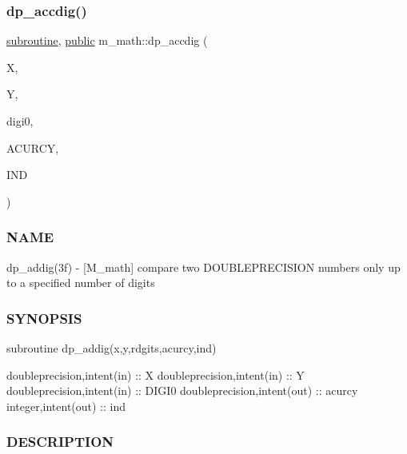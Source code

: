 \subsubsection{\texorpdfstring{dp\+\_\+accdig()}{dp\_accdig()}}
{\footnotesize\ttfamily \hyperlink{M__stopwatch_83_8txt_acfbcff50169d691ff02d4a123ed70482}{subroutine}, \hyperlink{M__stopwatch_83_8txt_a2f74811300c361e53b430611a7d1769f}{public} m\+\_\+math\+::dp\+\_\+accdig (\begin{DoxyParamCaption}\item[{doubleprecision, intent(\hyperlink{M__journal_83_8txt_afce72651d1eed785a2132bee863b2f38}{in})}]{X,  }\item[{doubleprecision, intent(\hyperlink{M__journal_83_8txt_afce72651d1eed785a2132bee863b2f38}{in})}]{Y,  }\item[{doubleprecision, intent(\hyperlink{M__journal_83_8txt_afce72651d1eed785a2132bee863b2f38}{in})}]{digi0,  }\item[{doubleprecision, intent(out)}]{A\+C\+U\+R\+CY,  }\item[{integer, intent(out)}]{I\+ND }\end{DoxyParamCaption})}



\subsubsection*{N\+A\+ME}

dp\+\_\+addig(3f) -\/ \mbox{[}M\+\_\+math\mbox{]} compare two D\+O\+U\+B\+L\+E\+P\+R\+E\+C\+I\+S\+I\+ON numbers only up to a specified number of digits 

\subsubsection*{S\+Y\+N\+O\+P\+S\+IS}

\begin{DoxyVerb}   subroutine dp_addig(x,y,rdgits,acurcy,ind)

    doubleprecision,intent(in)     :: X
    doubleprecision,intent(in)     :: Y
    doubleprecision,intent(in)     :: DIGI0
    doubleprecision,intent(out)    :: acurcy
    integer,intent(out) :: ind
\end{DoxyVerb}


\subsubsection*{D\+E\+S\+C\+R\+I\+P\+T\+I\+ON}

